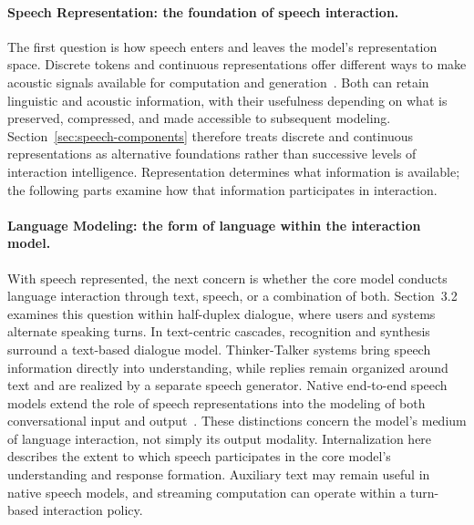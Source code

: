 \paragraph{Speech Representation: the foundation of speech interaction.}
The first question is how speech enters and leaves the model's representation space. Discrete tokens and continuous representations offer different ways to make acoustic signals available for computation and generation~\cite{DBLP:conf/acl/CuiYJMZWGK25}. Both can retain linguistic and acoustic information, with their usefulness depending on what is preserved, compressed, and made accessible to subsequent modeling. Section~\ref{sec:speech-components} therefore treats discrete and continuous representations as alternative foundations rather than successive levels of interaction intelligence. Representation determines what information is available; the following parts examine how that information participates in interaction.


\paragraph{Language Modeling: the form of language within the interaction model.}
With speech represented, the next concern is whether the core model conducts language interaction through text, speech, or a combination of both. Section~3.2 examines this question within half-duplex dialogue, where users and systems alternate speaking turns. In text-centric cascades, recognition and synthesis surround a text-based dialogue model. Thinker-Talker systems bring speech information directly into understanding, while replies remain organized around text and are realized by a separate speech generator. Native end-to-end speech models extend the role of speech representations into the modeling of both conversational input and output~\cite{}. These distinctions concern the model's medium of language interaction, not simply its output modality. Internalization here describes the extent to which speech participates in the core model's understanding and response formation. Auxiliary text may remain useful in native speech models, and streaming computation can operate within a turn-based interaction policy.

